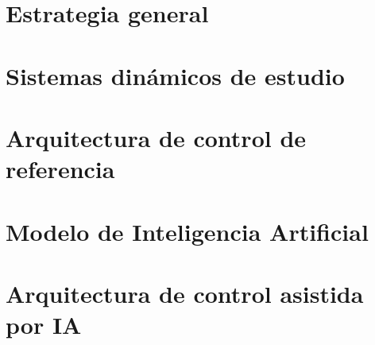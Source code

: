 \documentclass[12pt,a4paper]{report}
\begin{document}
%


\section{Estrategia general}

%
%
%
%
%
%
%
%


\section{Sistemas dinámicos de estudio}

%
%
%


\section{Arquitectura de control de referencia}

%
%


\section{Modelo de Inteligencia Artificial}

%
%
%


\section{Arquitectura de control asistida por IA}
\end{document}
